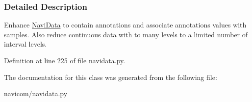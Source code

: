 \subsubsection{Detailed Description}
Enhance \hyperlink{classnavicom_1_1navidata_1_1NaviData}{NaviData} to contain annotations and associate annotations values with samples. Also reduce continuous data with to many levels to a limited number of interval levels. 

Definition at line \hyperlink{navidata_8py_source_l00225}{225} of file \hyperlink{navidata_8py_source}{navidata.py}.



The documentation for this class was generated from the following file:\begin{DoxyCompactItemize}
\item 
navicom/navidata.py\end{DoxyCompactItemize}
